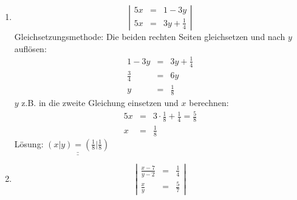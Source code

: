 \documentclass[%
11pt,%
twoside,%
titlepage,%
german,%
]{scrartcl}
\newcommand{\result}[1]{\underline{\underline{#1}}}
\begin{document}
\begin{enumerate}
\begin{enumerate}
  \item 
    \begin{displaymath}
      \left| 
        \begin{array}{rcl}
         5x & = & 1-3y \\
         5x & = & 3y+\frac{1}{4}
        \end{array} \right|
    \end{displaymath}
    Gleichsetzungsmethode: Die beiden rechten Seiten gleichsetzen und nach $y$ aufl\"osen:
    \begin{eqnarray*}
      1-3y & = & 3y+\frac{1}{4} \\
      \frac{3}{4} & = & 6y \\
      y & = & \frac{1}{8}
    \end{eqnarray*}
    $y$ z.B. in die zweite Gleichung einsetzen und $x$ berechnen:
    \begin{eqnarray*}
      5x & = & 3\cdot\frac{1}{8} + \frac{1}{4} = \frac{5}{8} \\
      x & = & \frac{1}{8}
    \end{eqnarray*}
    L\"osung: $\result{(x|y)=(\frac{1}{8}|\frac{1}{8})}$

  \item 
    \begin{displaymath}
      \left| 
        \begin{array}{rcl}
         \frac{x-7}{y-2} & = & \frac{1}{4} \\
          \frac{x}{y} & = & \frac{5}{7}
        \end{array} \right|
    \end{displaymath}


\end{enumerate}
\end{enumerate}
\end{document}
